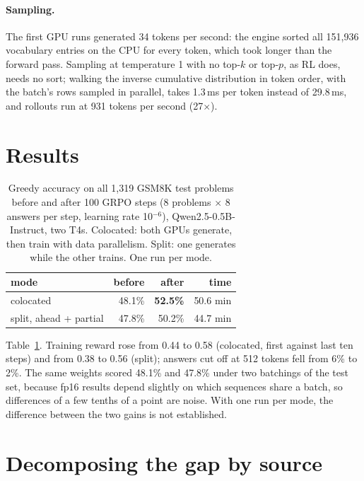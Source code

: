 \documentclass[11pt]{article}
\newcommand{\x}{$\times$}
\begin{document}
\paragraph{Sampling.} The first GPU runs generated 34 tokens per second: the engine sorted all
151,936 vocabulary entries on the CPU for every token, which took longer than the forward pass.
Sampling at temperature 1 with no top-$k$ or top-$p$, as RL does, needs no sort; walking the
inverse cumulative distribution in token order, with the batch's rows sampled in parallel, takes
1.3\,ms per token instead of 29.8\,ms, and rollouts run at 931 tokens per second (27\x).

\section{Results}
\label{sec:results}

\begin{table}[t]
\centering
\small
\begin{tabular}{lrrr}
\toprule
mode & before & after & time \\
\midrule
colocated & 48.1\% & \textbf{52.5\%} & 50.6 min \\
split, ahead + partial & 47.8\% & 50.2\% & 44.7 min \\
\bottomrule
\end{tabular}
\caption{Greedy accuracy on all 1,319 GSM8K test problems before and after 100 GRPO steps (8
problems $\times$ 8 answers per step, learning rate 10$^{-6}$), Qwen2.5-0.5B-Instruct, two T4s.
Colocated: both GPUs generate, then train with data parallelism. Split: one generates while the
other trains. One run per mode.}
\label{tab:gsm8k}
\end{table}

Table~\ref{tab:gsm8k}. Training reward rose from 0.44 to 0.58 (colocated, first against last ten
steps) and from 0.38 to 0.56 (split); answers cut off at 512 tokens fell from 6\% to 2\%. The same
weights scored 48.1\% and 47.8\% under two batchings of the test set, because fp16 results depend
slightly on which sequences share a batch, so differences of a few tenths of a point are noise.
With one run per mode, the difference between the two gains is not established.

\section{Decomposing the gap by source}
\label{sec:decompose}
\end{document}
